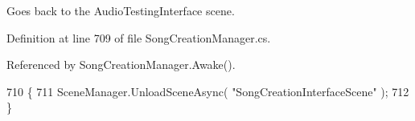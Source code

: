 Goes back to the Audio\+Testing\+Interface scene. 



Definition at line 709 of file Song\+Creation\+Manager.\+cs.



Referenced by Song\+Creation\+Manager.\+Awake().


\begin{DoxyCode}
710     \{
711         SceneManager.UnloadSceneAsync( \textcolor{stringliteral}{"SongCreationInterfaceScene"} );
712     \}
\end{DoxyCode}
